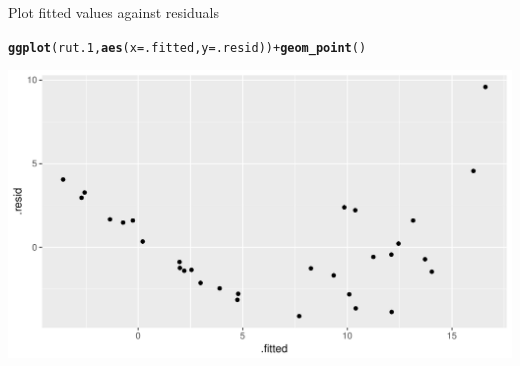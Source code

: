 \documentclass[unknownkeysallowed]{beamer}\usepackage[]{graphicx}\usepackage[]{color}
\makeatletter
\def\maxwidth{ %
  \ifdim\Gin@nat@width>\linewidth
    \linewidth
  \else
    \Gin@nat@width
  \fi
}
\newcommand{\hlopt}[1]{\textcolor[rgb]{0,0,0}{#1}}%
\newcommand{\hlstd}[1]{\textcolor[rgb]{0.345,0.345,0.345}{#1}}%
\newcommand{\hlkwc}[1]{\textcolor[rgb]{0.333,0.667,0.333}{#1}}%
\newcommand{\hlkwd}[1]{\textcolor[rgb]{0.737,0.353,0.396}{\textbf{#1}}}%
\newenvironment{kframe}{%
 \def\at@end@of@kframe{}%
 \ifinner\ifhmode%
  \def\at@end@of@kframe{\end{minipage}}%
  \begin{minipage}{\columnwidth}%
 \fi\fi%
 \def\FrameCommand##1{\hskip\@totalleftmargin \hskip-\fboxsep
 \colorbox{shadecolor}{##1}\hskip-\fboxsep
     \hskip-\linewidth \hskip-\@totalleftmargin \hskip\columnwidth}%
 \MakeFramed {\advance\hsize-\width
   \@totalleftmargin\z@ \linewidth\hsize
   \@setminipage}}%
 {\par\unskip\endMakeFramed%
 \at@end@of@kframe}
\newenvironment{knitrout}{}{} %
\makeatother
\begin{document}
\begin{frame}[fragile]{Plot fitted values against residuals}
  
\begin{knitrout}
\color{fgcolor}\begin{kframe}
\begin{alltt}
\hlkwd{ggplot}\hlstd{(rut.1,}\hlkwd{aes}\hlstd{(}\hlkwc{x}\hlstd{=.fitted,}\hlkwc{y}\hlstd{=.resid))}\hlopt{+}\hlkwd{geom_point}\hlstd{()}
\end{alltt}
\end{kframe}
\includegraphics[width=\maxwidth]{figure/unnamed-chunk-280-1} 

\end{knitrout}
  
\end{frame}
\end{document}
